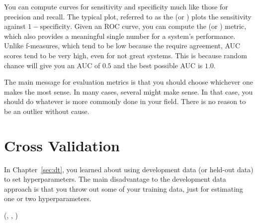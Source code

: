 You can compute curves for sensitivity and specificity much like those
for precision and recall.  The typical plot, referred to as the
 (or )
plots the sensitivity against $1 - \text{specificity}$.  Given an ROC
curve, you can compute the  (or
) metric, which also provides a meaningful single number
for a system's performance.  Unlike f-measures, which tend to be low
because the require agreement, AUC scores tend to be very high, even
for not great systems.  This is because random chance will give you an
AUC of $0.5$ and the best possible AUC is $1.0$.

The main message for evaluation metrics is that you should choose
whichever one makes the most sense.  In many cases, several might make
sense.  In that case, you should do whatever is more commonly done in
your field.  There is no reason to be an outlier without cause.

\section{Cross Validation}

In Chapter~\ref{sec:dt}, you learned about using development data (or
held-out data) to set hyperparameters.  The main disadvantage to the
development data approach is that you throw out some of your training
data, just for estimating one or two hyperparameters.

%
  {(, , )}
  {
\SETST{$\hat\ep$}{$\infty$}
\ENDFOR
{}
\SETST{$\hat\al$}{$\VARm{\al}$}
\ENDIF
\ENDFOR
}

